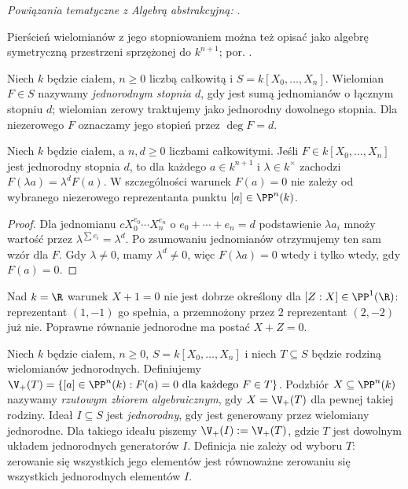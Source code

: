 \noindent\emph{Powiązania tematyczne z Algebrą abstrakcyjną:} .


Pierścień wielomianów z jego stopniowaniem można też opisać jako algebrę symetryczną przestrzeni sprzężonej do $k^{n+1}$; por. .

\begin{definicja}
Niech $k$ będzie ciałem, $n\ge0$ liczbą całkowitą
i $S=k[X_0,\ldots,X_n]$.
Wielomian $F\in S$ nazywamy \emph{jednorodnym stopnia $d$},
gdy jest sumą jednomianów o łącznym stopniu $d$; wielomian
zerowy traktujemy jako jednorodny dowolnego stopnia.
Dla niezerowego $F$ oznaczamy jego stopień przez $\deg F=d$.
\end{definicja}

\begin{lemat}
Niech $k$ będzie ciałem, a $n,d\ge0$ liczbami całkowitymi.
Jeśli $F\in k[X_0,\dots,X_n]$ jest jednorodny stopnia $d$,
to dla każdego $a\in k^{n+1}$ i $\lambda\in k^\times$ zachodzi
$F(\lambda a)=\lambda^dF(a)$. W szczególności warunek
$F(a)=0$ nie zależy od wybranego niezerowego reprezentanta
punktu $[a]\in\PP^n(k)$.
\end{lemat}
\begin{proof}
Dla jednomianu $cX_0^{e_0}\cdots X_n^{e_n}$
o $e_0+\cdots+e_n=d$ podstawienie $\lambda a_i$
mnoży wartość przez $\lambda^{\sum e_i}=\lambda^d$.
Po zsumowaniu jednomianów otrzymujemy ten sam wzór dla $F$.
Gdy $\lambda\ne0$, mamy $\lambda^d\ne0$,
więc $F(\lambda a)=0$ wtedy i tylko wtedy, gdy $F(a)=0$.
\end{proof}

\begin{uwaga}
Nad $k=\R$ warunek $X+1=0$ nie jest dobrze określony dla
$[Z:X]\in\PP^1(\R)$: reprezentant $(1,-1)$ go spełnia,
a przemnożony przez $2$ reprezentant $(2,-2)$ już nie.
Poprawne równanie jednorodne ma postać $X+Z=0$.
\end{uwaga}

\begin{definicja}
Niech $k$ będzie ciałem, $n\ge0$, $S=k[X_0,\dots,X_n]$ i niech $T\subseteq S$ będzie
rodziną wielomianów jednorodnych. Definiujemy
$\V_+(T)=\{[a]\in\PP^n(k):F(a)=0\text{ dla każdego }F\in T\}$.
Podzbiór $X\subseteq\PP^n(k)$ nazywamy \emph{rzutowym
zbiorem algebraicznym}, gdy $X=\V_+(T)$ dla pewnej takiej rodziny.
Ideał $I\subseteq S$ jest \emph{jednorodny}, gdy jest generowany
przez wielomiany jednorodne. Dla takiego ideału piszemy
$\V_+(I):=\V_+(T)$, gdzie $T$ jest dowolnym układem
jednorodnych generatorów $I$. Definicja nie zależy
od wyboru $T$: zerowanie się wszystkich jego elementów
jest równoważne zerowaniu się wszystkich jednorodnych
elementów $I$.
\end{definicja}


